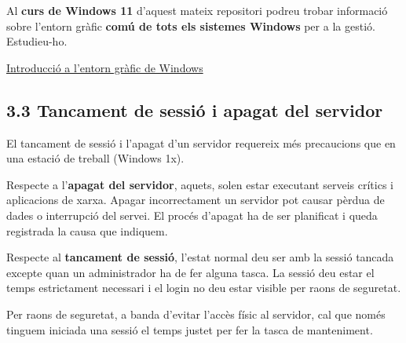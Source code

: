 \documentclass[
  a4paper,
]{article}
\begin{document}
Al \textbf{curs de Windows 11} d'aquest mateix repositori podreu trobar
informació sobre l'entorn gràfic \textbf{comú de tots els sistemes
Windows} per a la gestió. Estudieu-ho.

\href{https://tofermos.github.io/Windows11/interfaces/interfaces.html}{Introducció
a l'entorn gràfic de Windows}

\subsection{3.3 Tancament de sessió i apagat del
servidor}\label{tancament-de-sessiuxf3-i-apagat-del-servidor}

El tancament de sessió i l'apagat d'un servidor requereix més
precaucions que en una estació de treball (Windows 1x).

Respecte a l'\textbf{apagat del servidor}, aquets, solen estar executant
serveis crítics i aplicacions de xarxa. Apagar incorrectament un
servidor pot causar pèrdua de dades o interrupció del servei. El procés
d'apagat ha de ser planificat i queda registrada la causa que indiquem.

Respecte al \textbf{tancament de sessió}, l'estat normal deu ser amb la
sessió tancada excepte quan un administrador ha de fer alguna tasca. La
sessió deu estar el temps estrictament necessari i el login no deu estar
visible per raons de seguretat.

Per raons de seguretat, a banda d'evitar l'accès físic al servidor, cal
que només tinguem iniciada una sessió el temps justet per fer la tasca
de manteniment.
\end{document}
